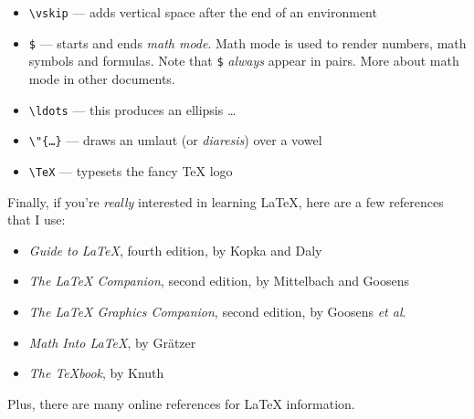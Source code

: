 \documentclass{article}
\begin{document}
\begin{itemize}
  \item {\tt \textbackslash vskip} --- adds vertical space after the end of an
  environment
  \item {\tt \$} --- starts and ends \emph{math mode}. Math mode is used to
  render numbers, math symbols and formulas. Note that {\tt \$} \emph{always}
  appear in pairs. More about math mode in other documents.
  \item {\tt \textbackslash ldots} --- this produces an ellipsis
  \ldots
  \item {\tt \textbackslash "\{\ldots\}} --- draws an umlaut (or
  \emph{diaresis}) over a vowel
  \item {\tt \textbackslash TeX} --- typesets the fancy \TeX{} logo
\end{itemize}
\vskip12pt

Finally, if you're \emph{really} interested in learning \LaTeX{}, here are a few
references that I use:
\begin{itemize}
  \item \emph{Guide to \LaTeX{}}, fourth edition, by Kopka and Daly
  \item \emph{The \LaTeX{} Companion}, second edition, by Mittelbach and Goosens
  \item \emph{The \LaTeX{} Graphics Companion}, second edition, by Goosens
  \emph{et al}.
  \item \emph{Math Into \LaTeX{}}, by Gr\"{a}tzer
  \item \emph{The \TeX book}, by Knuth
\end{itemize}
Plus, there are many online references for \LaTeX{} information.
\end{document}
